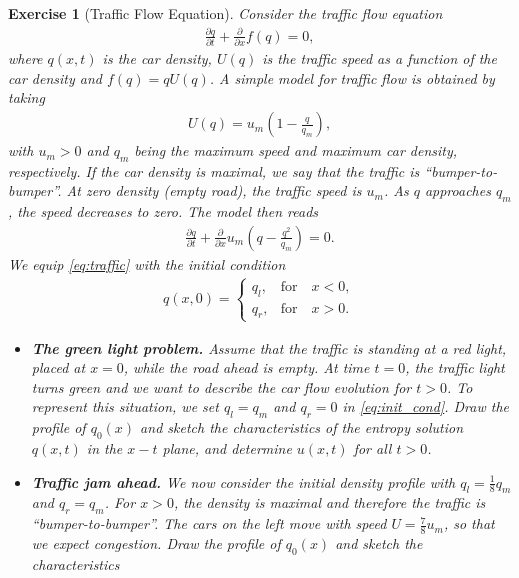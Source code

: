 \documentclass[10pt,letterpaper]{article}
\theoremstyle{break}
\newtheorem{exercise}{Exercise}
\begin{document}
\begin{exercise}[Traffic Flow Equation]
	Consider the traffic flow equation
	\begin{align}
		\frac{\partial q}{\partial t}
		+
		\frac{\partial}{\partial x}
		f(q)
		=
		0,
	\end{align}
	where $q(x,t)$ is the car density, $U(q)$ is the traffic speed
	as a function of the car density
	and $f(q) = q U(q)$.
	A simple model for traffic flow is obtained by taking
	\begin{align}
		U(q)
		=
		u_m
		\left(
			1-\frac{q}{q_m}
		\right),
	\end{align}
	with $u_m>0$ and $q_m$ being the maximum speed
	and maximum car density, respectively.
	If the car density is maximal, we say that the traffic is ``bumper-to-bumper''.
	At zero density (empty road), the traffic speed is $u_m$.
	As $q$ approaches $q_m$, the speed decreases to zero. The model then reads
	\begin{align}\label{eq:traffic}
		\frac{\partial q}{\partial t}
		+
		\frac{\partial}{\partial x}
		u_m
		\left(
			q-\frac{q^2}{q_m}
		\right)
		=
		0.
	\end{align}
	We equip \eqref{eq:traffic} with the initial condition
	\begin{align}\label{eq:init_cond}
		q(x,0)
		=
		\left\{
		\begin{array}{cl}
		q_l, & \text{for} \quad x<0,\\
		q_r, &\text{for} \quad x>0.
		\end{array}
		\right.
	\end{align}
	\begin{itemize}
	\item[(a)] {\bf The green light problem.}
	Assume that the traffic is standing at a red light, placed at $x = 0$, while the road ahead is empty.
	At time $t = 0$, the traffic light turns green and we want to describe the car flow
	evolution for $t>0$. To represent this situation, we set $q_l = q_m$ and $q_r =0$ in
	\eqref{eq:init_cond}.
	Draw the profile of $q_0(x)$ and sketch the characteristics
	of the entropy solution $q(x,t)$ in the $x-t$ plane, and
	determine $u(x,t)$ for all $t > 0$.
	\item[(b)] {\bf Traffic jam ahead.}
	We now consider the initial density profile 
	with $q_l = \frac{1}{8}q_m$ and $q_r =q_m$.
	For $x > 0$, the density is maximal and therefore the traffic is ``bumper-to-bumper''.
	The cars on the left move with speed $U = \frac{7}{8}u_m$, so that we expect congestion.
	Draw the profile of $q_0(x)$ and sketch the characteristics

\end{itemize}
\end{exercise}
\end{document}
